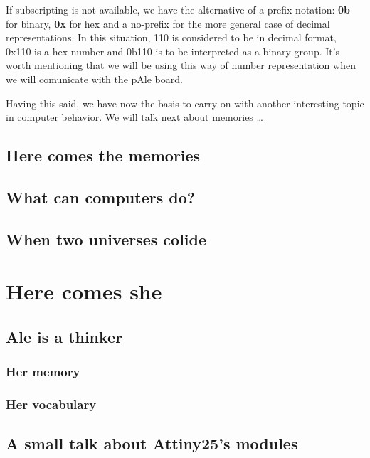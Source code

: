 \documentclass[12pt, a4paper]{book}
\begin{document}
If subscripting is not available, we have the alternative of a prefix notation: \textbf{0b} for binary, \textbf{0x} for hex and a no-prefix for the more general case of decimal representations. In this situation, 110 is considered to be in decimal format, 0x110 is a hex number and 0b110 is to be interpreted as a binary group. It's worth mentioning that we will be using this way of number representation when we will comunicate with the pAle board.

Having this said, we have now the basis to carry on with another interesting topic in computer behavior. We will talk next about memories \ldots

\section{Here comes the memories}


\section{What can computers do?}
\section{When two universes colide}
\chapter{Here comes she}
\section{Ale is a thinker}
\subsection{Her memory}
\subsection{Her vocabulary}
\section{A small talk about Attiny25's modules}
\end{document}
